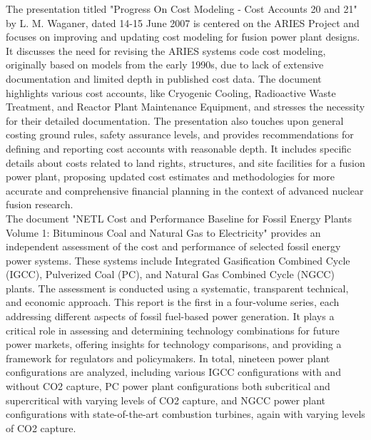 The presentation titled "Progress On Cost Modeling - Cost Accounts 20 and 21" by L. M. Waganer, dated 14-15 June 2007 \cite{Waganer2007} is centered on the ARIES Project and focuses on improving and updating cost modeling for fusion power plant designs. It discusses the need for revising the ARIES systems code cost modeling, originally based on models from the early 1990s, due to lack of extensive documentation and limited depth in published cost data. The document highlights various cost accounts, like Cryogenic Cooling, Radioactive Waste Treatment, and Reactor Plant Maintenance Equipment, and stresses the necessity for their detailed documentation. The presentation also touches upon general costing ground rules, safety assurance levels, and provides recommendations for defining and reporting cost accounts with reasonable depth. It includes specific details about costs related to land rights, structures, and site facilities for a fusion power plant, proposing updated cost estimates and methodologies for more accurate and comprehensive financial planning in the context of advanced nuclear fusion research.\\

The document "NETL Cost and Performance Baseline for Fossil Energy Plants Volume 1: Bituminous Coal and Natural Gas to Electricity" \cite{JamesCorrespondingAuthor2019} provides an independent assessment of the cost and performance of selected fossil energy power systems. These systems include Integrated Gasification Combined Cycle (IGCC), Pulverized Coal (PC), and Natural Gas Combined Cycle (NGCC) plants. The assessment is conducted using a systematic, transparent technical, and economic approach. This report is the first in a four-volume series, each addressing different aspects of fossil fuel-based power generation. It plays a critical role in assessing and determining technology combinations for future power markets, offering insights for technology comparisons, and providing a framework for regulators and policymakers. In total, nineteen power plant configurations are analyzed, including various IGCC configurations with and without CO2 capture, PC power plant configurations both subcritical and supercritical with varying levels of CO2 capture, and NGCC power plant configurations with state-of-the-art combustion turbines, again with varying levels of CO2 capture.


